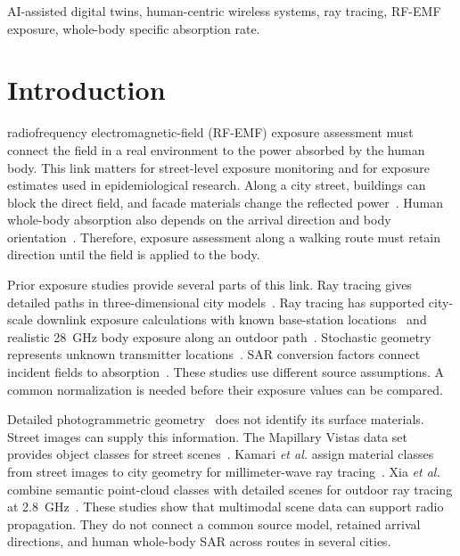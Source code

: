 \documentclass{IEEEoj}
\begin{document}
\begin{IEEEkeywords}
AI-assisted digital twins, human-centric wireless systems, ray tracing,
RF-EMF exposure, whole-body specific absorption rate.
\end{IEEEkeywords}

\maketitle

\section{Introduction}\label{sec:introduction}

 radiofrequency electromagnetic-field (RF-EMF)
exposure assessment must connect the field in a real environment to the power
absorbed by the human body. This link matters for street-level exposure
monitoring and for exposure estimates used in epidemiological research. Along
a city street, buildings can block the direct field, and facade materials
change the reflected power~\cite{itu2040,vitucci}. Human whole-body absorption
also depends on the arrival direction and body orientation~\cite{icnirp}.
Therefore, exposure assessment along a walking route must retain direction
until the field is applied to the body.

Prior exposure studies provide several parts of this link. Ray tracing gives
detailed paths in three-dimensional city models~\cite{sionna}. Ray tracing has supported
city-scale downlink exposure calculations with known base-station
locations~\cite{leeman} and realistic 28~GHz body exposure along an outdoor
path~\cite{wydaeghe2026}. Stochastic geometry represents unknown transmitter
locations~\cite{wiame}. SAR conversion factors connect incident fields to
absorption~\cite{varsier}. These studies use different source assumptions.
A common normalization is needed before their exposure values can be compared.

Detailed photogrammetric geometry~\cite{google3d,blosm} does not identify its
surface materials. Street images can supply this information. The Mapillary
Vistas data set provides object classes for street scenes~\cite{vistas}.
Kamari \emph{et al.} assign material classes from street images to city geometry
for millimeter-wave ray tracing~\cite{mmsv}. Xia \emph{et al.} combine semantic
point-cloud classes with detailed scenes for outdoor ray tracing at
2.8~GHz~\cite{xia2024}. These studies show that multimodal scene data can
support radio propagation. They do not connect a common source model, retained
arrival directions, and human whole-body SAR across routes in several cities.
\end{document}

